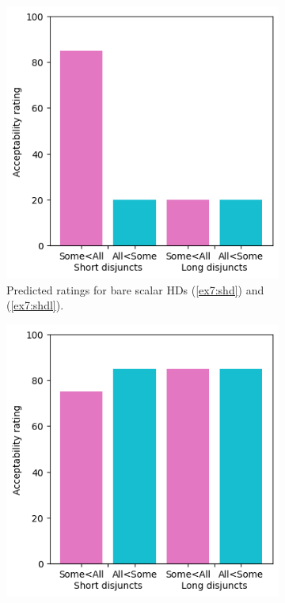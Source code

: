 \begin{figure}[H]
	\centering
	\begin{subfigure}[t]{.32\linewidth}
		\centering
		\includegraphics[width=\linewidth]{./pred-2-noonly.png}
		\caption[]{Predicted ratings for bare scalar HDs (\ref{ex7:shd}) and (\ref{ex7:shdl}).}
	\end{subfigure}
	\hfill
	\begin{subfigure}[t]{.32\linewidth}
		\centering
		\includegraphics[width=\linewidth]{./pred-2-only.png}

\end{subfigure}
\end{figure}
